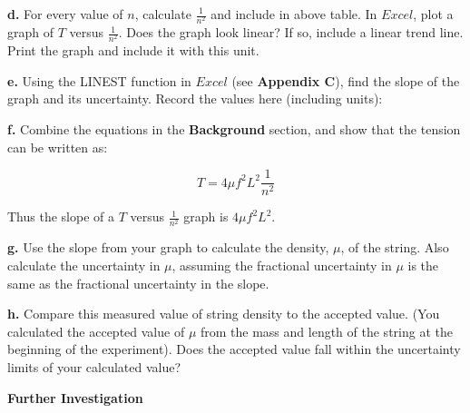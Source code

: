 \textbf{d. } For every value of $n$, calculate $\frac{1}{n^2}$ and include in above table. In $Excel$, plot a graph of $T$ versus $\frac{1}{n^2}$. Does the graph look linear? If so, include a linear trend line. Print the graph and include it with this unit.
\vspace{20mm}

\textbf{e. } Using the LINEST function in $Excel$ (see \textbf{Appendix C}), find the slope of the graph and its uncertainty. Record the values here (including units):

\vspace{20mm}

\textbf{f. } Combine the equations in the \textbf{Background } section, and show that the tension can be written as:

\begin{equation}
T=4\mu f^{2}L^{2}\frac{1}{n^2}
\end{equation}

\vspace{25mm}

Thus the slope of a $T$ versus $\frac{1}{n^2}$ graph is $4\mu f^{2}L^{2}$.

\textbf{g. } Use the slope from your graph to calculate the density, $\mu $, of the string. Also calculate the uncertainty in $\mu$, assuming the fractional uncertainty in $\mu$ is the same as the fractional uncertainty in the slope.

\vspace{5cm}

\textbf{h. } Compare this measured value of string density to the accepted value. (You calculated the accepted value of $\mu $ from the mass and length of the string at the beginning of the experiment). Does the accepted value fall within the uncertainty limits of your calculated value?

\vspace{50mm}




\textbf{Further Investigation}


